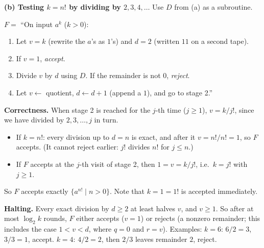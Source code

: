 \begin{soln}
\textbf{(b) Testing $k=n!$ by dividing by $2,3,4,\dots$} Use $D$ from (a) as a subroutine.

$F=$ ``On input $a^k$ ($k>0$):
\begin{enumerate}
\item Let $v=k$ (rewrite the $a$'s as $1$'s) and $d=2$ (written $11$ on a second tape).
\item If $v=1$, \emph{accept}.
\item Divide $v$ by $d$ using $D$. If the remainder is not $0$, \emph{reject}.
\item Let $v\leftarrow$ quotient, $d\leftarrow d+1$ (append a $1$), and go to stage 2.''
\end{enumerate}

\textbf{Correctness.} When stage 2 is reached for the $j$-th time ($j\ge1$), $v=k/j!$, since we have divided by $2,3,\dots,j$ in turn.
\begin{itemize}
\item If $k=n!$: every division up to $d=n$ is exact, and after it $v=n!/n!=1$, so $F$ accepts. (It cannot reject earlier: $j!$ divides $n!$ for $j\le n$.)
\item If $F$ accepts at the $j$-th visit of stage 2, then $1=v=k/j!$, i.e.\ $k=j!$ with $j\ge1$.
\end{itemize}
So $F$ accepts exactly $\{a^{n!}\mid n>0\}$. Note that $k=1=1!$ is accepted immediately.

\textbf{Halting.} Every exact division by $d\ge2$ at least halves $v$, and $v\ge1$. So after at most $\log_2 k$ rounds, $F$ either accepts ($v=1$) or rejects (a nonzero remainder; this includes the case $1<v<d$, where $q=0$ and $r=v$).
Examples: $k=6$: $6/2=3$, $3/3=1$, accept. $k=4$: $4/2=2$, then $2/3$ leaves remainder $2$, reject.
\end{soln}
